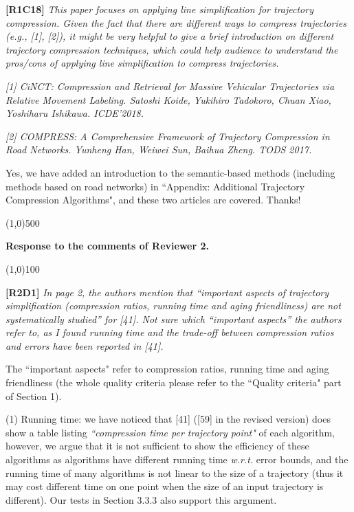 \documentclass{letter}
\newcommand{\wrt}{\emph{w.r.t.}\xspace}
\begin{document}
{\textbf{[R1C18]} \emph{ This paper focuses on applying line simplification for trajectory compression. Given the fact that there are different ways to compress trajectories (e.g., [1], [2]), it might be very helpful to give a brief introduction on different trajectory compression techniques, which could help audience to understand the pros/cons of applying line simplification to compress trajectories. }

\emph{ [1] CiNCT: Compression and Retrieval for Massive Vehicular Trajectories via Relative Movement Labeling. Satoshi Koide, Yukihiro Tadokoro, Chuan Xiao, Yoshiharu Ishikawa. ICDE'2018.}

\emph{ [2] COMPRESS: A Comprehensive Framework of Trajectory Compression in Road Networks. Yunheng Han, Weiwei Sun, Baihua Zheng. TODS 2017.}


{Yes, we have added an introduction to the semantic-based methods (including methods based on road networks) in ``Appendix: Additional Trajectory Compression Algorithms", and these two articles are covered. Thanks!} 

\line(1,0){500}

\textbf{Response to the comments of Reviewer 2.}

\line(1,0){100}

\textbf{[R2D1]} \emph{In page 2, the authors mention that “important aspects of trajectory simplification (compression ratios, running time and aging friendliness) are not systematically studied” for [41]. Not sure which “important aspects” the authors refer to, as I found running time and the trade-off between compression ratios and errors have been reported in [41].}

The ``important aspects" refer to compression ratios, running time and aging friendliness (the whole quality criteria please refer to the ``Quality criteria" part of Section 1).

(1) Running time: we have noticed that [41] ([59] in the revised version) does show a table listing \emph{``compression time per trajectory point"} of each algorithm, however, we argue that it is not sufficient to show the efficiency of these algorithms as algorithms have different running time \wrt error bounds, and the running time of many algorithms is not linear to the size of a trajectory (thus it may cost different time on one point when the size of an input trajectory is different). Our tests in Section 3.3.3 also support this argument.
 
}
\end{document}
